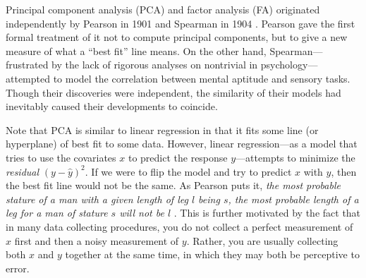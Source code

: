 Principal component analysis (PCA) and factor analysis (FA) originated independently by Pearson in 1901 and Spearman in 1904 \cite{1901pearson, 1904spearman}. Pearson gave the first formal treatment of it not to compute principal components, but to give a new measure of what a ``best fit'' line means. On the other hand, Spearman---frustrated by the lack of rigorous analyses on nontrivial in  psychology---attempted to model the correlation between mental aptitude and sensory tasks. Though their discoveries were independent, the similarity of their models had inevitably caused their developments to coincide. 

Note that PCA is similar to linear regression in that it fits some line (or hyperplane) of best fit to some data. However, linear regression---as a model that tries to use the covariates $x$ to predict the response $y$---attempts to minimize the \textit{residual} $(y - \hat{y})^2$. If we were to flip the model and try to predict $x$ with $y$, then the best fit line would not be the same. As Pearson puts it, \textit{the most probable stature of a man with a given length of leg $l$ being $s$, the most probable length of a leg for a man of stature $s$ will not be $l$} \cite{1901pearson}. This is further motivated by the fact that in many data collecting procedures, you do not collect a perfect measurement of $x$ first and then a noisy measurement of $y$. Rather, you are usually collecting both $x$ and $y$ together at the same time, in which they may both be perceptive to error. 

